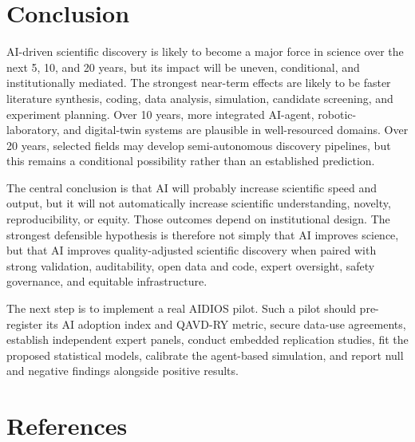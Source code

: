\documentclass[12pt]{article}
\begin{document}
\section{Conclusion}

AI-driven scientific discovery is likely to become a major force in science over the next 5, 10, and 20 years, but its impact will be uneven, conditional, and institutionally mediated. The strongest near-term effects are likely to be faster literature synthesis, coding, data analysis, simulation, candidate screening, and experiment planning. Over 10 years, more integrated AI-agent, robotic-laboratory, and digital-twin systems are plausible in well-resourced domains. Over 20 years, selected fields may develop semi-autonomous discovery pipelines, but this remains a conditional possibility rather than an established prediction.

The central conclusion is that AI will probably increase scientific speed and output, but it will not automatically increase scientific understanding, novelty, reproducibility, or equity. Those outcomes depend on institutional design. The strongest defensible hypothesis is therefore not simply that AI improves science, but that AI improves quality-adjusted scientific discovery when paired with strong validation, auditability, open data and code, expert oversight, safety governance, and equitable infrastructure.

The next step is to implement a real AIDIOS pilot. Such a pilot should pre-register its AI adoption index and QAVD-RY metric, secure data-use agreements, establish independent expert panels, conduct embedded replication studies, fit the proposed statistical models, calibrate the agent-based simulation, and report null and negative findings alongside positive results.

\section*{References}
\end{document}
